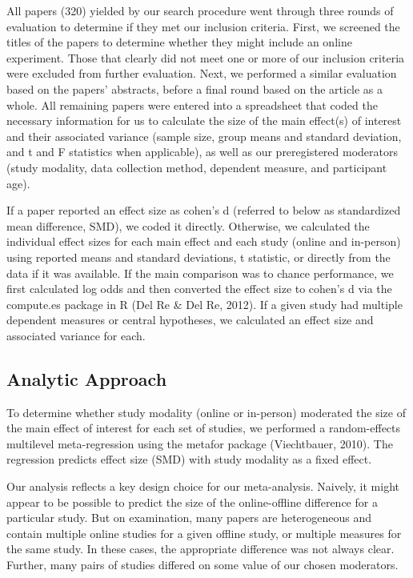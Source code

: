 \documentclass[
  man,floatsintext]{apa6}
\begin{document}
All papers (320) yielded by our search procedure went through three rounds of evaluation to determine if they met our inclusion criteria. First, we screened the titles of the papers to determine whether they might include an online experiment. Those that clearly did not meet one or more of our inclusion criteria were excluded from further evaluation. Next, we performed a similar evaluation based on the papers' abstracts, before a final round based on the article as a whole. All remaining papers were entered into a spreadsheet that coded the necessary information for us to calculate the size of the main effect(s) of interest and their associated variance (sample size, group means and standard deviation, and t and F statistics when applicable), as well as our preregistered moderators (study modality, data collection method, dependent measure, and participant age).

If a paper reported an effect size as cohen's d (referred to below as standardized mean difference, SMD), we coded it directly. Otherwise, we calculated the individual effect sizes for each main effect and each study (online and in-person) using reported means and standard deviations, t statistic, or directly from the data if it was available. If the main comparison was to chance performance, we first calculated log odds and then converted the effect size to cohen's d via the compute.es package in R (Del Re \& Del Re, 2012). If a given study had multiple dependent measures or central hypotheses, we calculated an effect size and associated variance for each.

\hypertarget{analytic-approach}{%
\subsection{Analytic Approach}\label{analytic-approach}}

To determine whether study modality (online or in-person) moderated the size of the main effect of interest for each set of studies, we performed a random-effects multilevel meta-regression using the metafor package (Viechtbauer, 2010). The regression predicts effect size (SMD) with study modality as a fixed effect.

Our analysis reflects a key design choice for our meta-analysis. Naively, it might appear to be possible to predict the size of the online-offline difference for a particular study. But on examination, many papers are heterogeneous and contain multiple online studies for a given offline study, or multiple measures for the same study. In these cases, the appropriate difference was not always clear. Further, many pairs of studies differed on some value of our chosen moderators.
\end{document}
